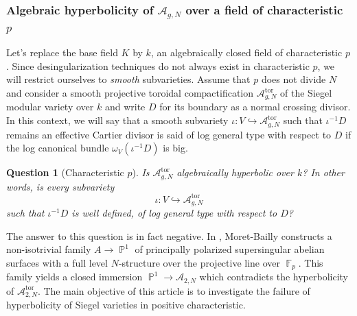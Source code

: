 \documentclass[11pt]{amsart}
\numberwithin{subsection}{section}
\numberwithin{figure}{section}
\numberwithin{table}{section}
\theoremstyle{1}
\newtheorem*{question*}{Question}
\theoremstyle{2}
\DeclareMathOperator{\F}{\mathbb{F}}
\DeclareMathOperator{\tor}{tor}
\DeclareMathOperator{\Pb}{\mathbb{P}}
\begin{document}
\subsubsection*{Algebraic hyperbolicity of $\mathcal{A}_{g,N}$ over a field of characteristic $p$}
Let's replace the base field $K$ by $k$, an algebraically closed field of characteristic $p$. Since desingularization techniques do not always exist in characteristic $p$, we will restrict ourselves to \emph{smooth} subvarieties. Assume that $p$ does not divide $N$ and consider a smooth projective toroidal compactification $\mathcal{A}^{\tor}_{g,N}$ of the Siegel modular variety over $k$ and write $D$ for its boundary as a normal crossing divisor. In this context, we will say that a smooth subvariety $\iota : V \hookrightarrow \mathcal{A}^{\tor}_{g,N}$ such that $\iota^{-1}D$ remains an effective Cartier divisor is said of log general type with respect to $D$ if the log canonical bundle $\omega_V (\iota^{-1}D)$ is big.
\begin{question*}[Characteristic $p$]
Is $\mathcal{A}^{\tor}_{g,N}$ algebraically hyperbolic over $k$? In other words, is every subvariety
\begin{equation*}
\iota : V \hookrightarrow \mathcal{A}^{\tor}_{g,N}
\end{equation*}
such that $\iota^{-1}D$ is well defined, of log general type with respect to $D$? 
\end{question*}
\vspace{0.2cm}
The answer to this question is in fact negative. In \cite{MR3618576}, Moret-Bailly constructs a non-isotrivial family $A \rightarrow \Pb^1$ of principally polarized supersingular abelian surfaces with a full level $N$-structure over the projective line over $\F_p$. This family yields a closed immersion $\Pb^1\rightarrow \mathcal{A}_{2,N}$ which contradicts the hyperbolicity of $\mathcal{A}^{\tor}_{2,N}$. The main objective of this article is to investigate the failure of hyperbolicity of Siegel varieties in positive characteristic.
\end{document}
